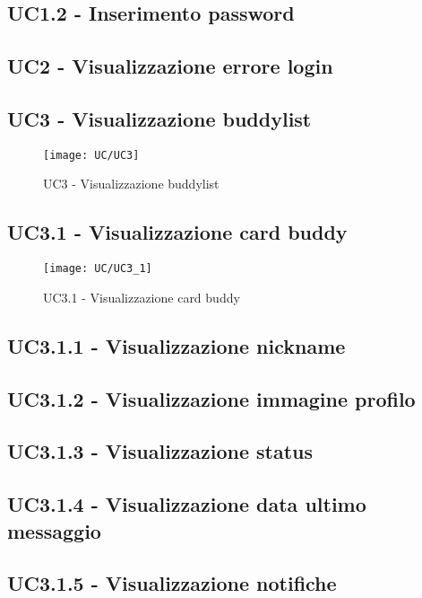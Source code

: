 \subsection{UC1.2 - Inserimento password}


\subsection{UC2 - Visualizzazione errore login}


\subsection{UC3 - Visualizzazione buddylist}
\begin{figure}[H] 
	\centering
	\texttt{[image: UC/UC3]}
	\caption{UC3 - Visualizzazione buddylist}
\end{figure}

\subsection{UC3.1 - Visualizzazione card buddy}
\begin{figure}[H] 
	\centering
	\texttt{[image: UC/UC3\_1]}
	\caption{UC3.1 - Visualizzazione card buddy}
\end{figure}

\subsection{UC3.1.1 - Visualizzazione nickname}
\subsection{UC3.1.2 - Visualizzazione immagine profilo}
\subsection{UC3.1.3 - Visualizzazione status}
\subsection{UC3.1.4 - Visualizzazione data ultimo messaggio}
\subsection{UC3.1.5 - Visualizzazione notifiche}

